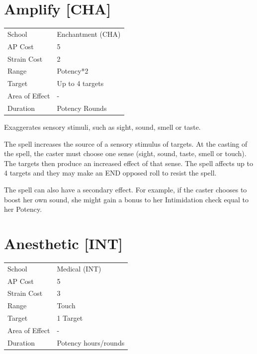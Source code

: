 \documentclass[11pt,a4paper,twocolumn]{book}
\begin{document}
\section*{Amplify [CHA]}
{
	\begin{tabu} to 75mm{| X[l,4] | X[l,7] |}
		\hline
		School 			& Enchantment (CHA) \\
        AP Cost	      	& 5 				\\
        Strain Cost     & 2 				\\
        Range     		& Potency*2 		\\
        Target      	& Up to 4 targets 	\\
        Area of Effect  & - 	 			\\
        Duration     	& Potency Rounds 	\\ \hline
	\end{tabu}
		
}

\medskip

Exaggerates sensory stimuli, such as sight, sound, smell or taste.

The spell increases the source of a sensory stimulus of targets. At the casting of the spell, the caster must choose one sense (sight, sound, taste, smell or touch). The targets then produce an increased effect of that sense. The spell affects up to 4 targets and they may make an END opposed roll to resist the spell.

The spell can also have a secondary effect. For example, if the caster chooses to boost her own sound, she might gain a bonus to her Intimidation check equal to her Potency.


\section*{Anesthetic [INT]}
{
	\begin{tabu} to 75mm{| X[l,4] | X[l,7] |}
		\hline
		School 			& Medical (INT) 	\\
        AP Cost	      	& 5 				\\
        Strain Cost     & 3 				\\
        Range     		& Touch 			\\
        Target      	& 1 Target 			\\
        Area of Effect  & - 	 			\\
        Duration     	& Potency hours/rounds 	\\ \hline
	\end{tabu}
		
}
\end{document}
